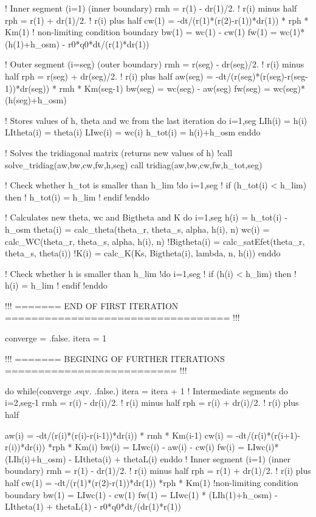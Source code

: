     ! Inner segment (i=1) (inner boundary)
    rmh = r(1) - dr(1)/2.	! r(i) minus half
    rph = r(1) + dr(1)/2.	! r(i) plus half
    cw(1) = -dt/(r(1)*(r(2)-r(1))*dr(1)) * rph * Km(1)
    ! non-limiting condition boundary
    bw(1) = wc(1) - cw(1)
    fw(1) = wc(1)*(h(1)+h_osm) - r0*q0*dt/(r(1)*dr(1))
    
    ! Outer segment (i=seg) (outer boundary)
    rmh = r(seg) - dr(seg)/2.	! r(i) minus half
    rph = r(seg) + dr(seg)/2.	! r(i) plus half
    aw(seg) = -dt/(r(seg)*(r(seg)-r(seg-1))*dr(seg)) * rmh * Km(seg-1)
    bw(seg) = wc(seg) - aw(seg)
    fw(seg) = wc(seg)*(h(seg)+h_osm)
    
    ! Stores values of h, theta and wc from the last iteration
    do i=1,seg
      LIh(i) = h(i)
      LItheta(i) = theta(i)
      LIwc(i) = wc(i)
      h_tot(i) = h(i)+h_osm
    enddo
    
    ! Solves the tridiagonal matrix (returns new values of h)
    !call solve_tridiag(aw,bw,cw,fw,h,seg)
    call tridiag(aw,bw,cw,fw,h_tot,seg)
      
    ! Check whether h_tot is smaller than h_lim
    !do i=1,seg
    !  if (h_tot(i) < h_lim) then
    !    h_tot(i) = h_lim
    !  endif
    !enddo

    ! Calculates new theta, wc and Bigtheta and K
    do i=1,seg
      h(i) = h_tot(i) - h_osm
      theta(i) = calc_theta(theta_r, theta_s, alpha, h(i), n)
      wc(i) = calc_WC(theta_r, theta_s, alpha, h(i), n)
      !Bigtheta(i) = calc_satEfet(theta_r, theta_s, theta(i))
      !K(i) = calc_K(Ks, Bigtheta(i), lambda, n, h(i))
    enddo

    ! Check whether h is smaller than h_lim
    !do i=1,seg
    !  if (h(i) < h_lim) then
    !    h(i) = h_lim
    !  endif
    !enddo
        
    !!! ======= END OF FIRST ITERATION ================================== !!!
    
    converge = .false.
    itera = 1
    
    !!! ======= BEGINING OF FURTHER ITERATIONS ========================== !!!
    
    do while(converge .eqv. .false.)
      itera = itera + 1
      ! Intermediate segments
      do i=2,seg-1
        rmh = r(i) - dr(i)/2.	! r(i) minus half
        rph = r(i) + dr(i)/2.	! r(i) plus half
      
        aw(i) = -dt/(r(i)*(r(i)-r(i-1))*dr(i)) * rmh * Km(i-1)
        cw(i) = -dt/(r(i)*(r(i+1)-r(i))*dr(i)) *rph * Km(i)
        bw(i) = LIwc(i) - aw(i) - cw(i)
        fw(i) = LIwc(i)*(LIh(i)+h_osm) - LItheta(i) + thetaL(i)
      enddo
      ! Inner segment (i=1) (inner boundary)
      rmh = r(1) - dr(1)/2.	! r(i) minus half
      rph = r(1) + dr(1)/2.	! r(i) plus half
      cw(1) = -dt/(r(1)*(r(2)-r(1))*dr(1)) *rph * Km(1)
      !non-limiting condition boundary  
      bw(1) = LIwc(1) - cw(1)
      fw(1) = LIwc(1) * (LIh(1)+h_osm) - LItheta(1) + thetaL(1) - r0*q0*dt/(dr(1)*r(1))
      

